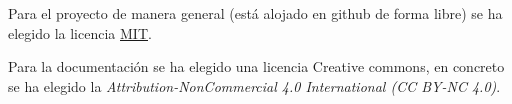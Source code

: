 
Para el proyecto de manera general (está alojado en github de forma libre) se ha elegido la licencia  \href{https://github.com/aguadotzn/TFM_MUINBDES/blob/master/LICENSE}{MIT}.

Para la documentación se ha elegido una licencia Creative commons, en concreto se ha elegido la \emph{Attribution-NonCommercial 4.0 International (CC BY-NC 4.0)}.

\label{commons}



